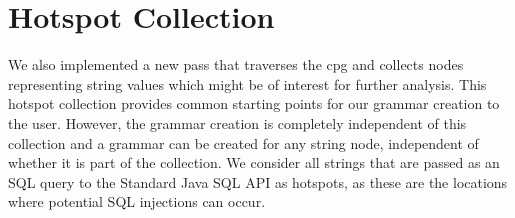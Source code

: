 \section{Hotspot Collection} 
We also implemented a new pass that traverses the \ac{cpg} and collects nodes representing string values which might be of interest for further analysis. 
This hotspot collection provides common starting points for our grammar creation to the user. However, the grammar creation is completely independent of this collection and a grammar can be created for any string node, independent of whether it is part of the collection.
We consider all strings that are passed as an SQL query to the Standard Java SQL API as hotspots, as these are the locations where potential SQL injections can occur.
